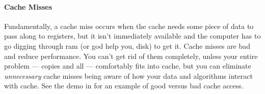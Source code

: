 \paragraph{Cache Misses} Fundamentally, a cache miss occurs when the cache 
needs some piece of data to pass along to registers, but it isn't immediately 
available and the computer has to go digging through ram (or god help you, 
disk) to get it.  Cache misses are bad and reduce performance.  You can't get 
rid of them completely, unless your entire problem --- copies and all --- 
comfortably fits into cache, but you can eliminate \emph{unnecessary} cache 
misses being aware of how your data and algorithms interact with cache.  See 
the demo  in \thispackage for an example of good versus 
bad cache access.